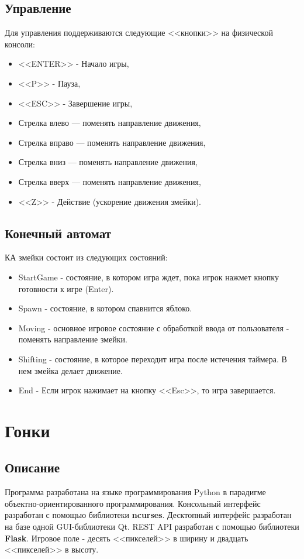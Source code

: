 \documentclass{article}
\begin{document}
\subsection{Управление}
Для управления поддерживаются следующие <<кнопки>> на физической консоли:
\begin{itemize}
    \item <<ENTER>> - Начало игры,
    \item <<P>> - Пауза,
    \item <<ESC>> - Завершение игры,
    \item Стрелка влево — поменять направление движения,
    \item Стрелка вправо — поменять направление движения,
    \item Стрелка вниз — поменять направление движения,
    \item Стрелка вверх — поменять направление движения,
    \item <<Z>> - Действие (ускорение движения змейки).
\end{itemize}

\subsection{Конечный автомат}
КА змейки состоит из следующих состояний:
\begin{itemize}
    \item StartGame - состояние, в котором игра ждет, пока игрок нажмет кнопку готовности к игре (Enter).
    \item Spawn - состояние, в котором спавнится яблоко.
    \item Moving - основное игровое состояние с обработкой ввода от пользователя - поменять направление змейки.
    \item Shifting - состояние, в которое переходит игра после истечения таймера.
          В нем змейка делает движение.
    \item End - Если игрок нажимает на кнопку <<Esc>>, то игра завершается.
\end{itemize}


\section{Гонки}
\subsection{Описание}
\small Программа разработана на языке программирования Python в парадигме объектно-ориентированного программирования.
Консольный интерфейс разработан с помощью библиотеки \textbf{ncurses}.
Десктопный интерфейс разработан на базе одной GUI-библиотеки Qt.
REST API разработан с помощью библиотеки \textbf{Flask}.
Игровое поле - десять <<пикселей>> в ширину и двадцать <<пикселей>> в высоту.
\end{document}
